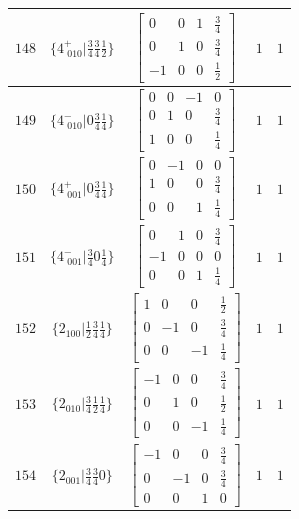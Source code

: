 \documentclass[fleqn,8pt]{jsarticle}
\begin{document}
\begin{longtable}{ccccc}
$ 148 $ & $ \{4^{+}_{\,\,010}|\frac{3}{4} \frac{3}{4} \frac{1}{2}\} $ & $ \begin{bmatrix} 0 & 0 & 1 & \frac{3}{4} \\ 0 & 1 & 0 & \frac{3}{4} \\ -1 & 0 & 0 & \frac{1}{2} \end{bmatrix} $ & $ 1 $ & $ 1 $ \\ \hline
$ 149 $ & $ \{4^{-}_{\,\,010}|0 \frac{3}{4} \frac{1}{4}\} $ & $ \begin{bmatrix} 0 & 0 & -1 & 0 \\ 0 & 1 & 0 & \frac{3}{4} \\ 1 & 0 & 0 & \frac{1}{4} \end{bmatrix} $ & $ 1 $ & $ 1 $ \\ \hline
$ 150 $ & $ \{4^{+}_{\,\,001}|0 \frac{3}{4} \frac{1}{4}\} $ & $ \begin{bmatrix} 0 & -1 & 0 & 0 \\ 1 & 0 & 0 & \frac{3}{4} \\ 0 & 0 & 1 & \frac{1}{4} \end{bmatrix} $ & $ 1 $ & $ 1 $ \\ \hline
$ 151 $ & $ \{4^{-}_{\,\,001}|\frac{3}{4} 0 \frac{1}{4}\} $ & $ \begin{bmatrix} 0 & 1 & 0 & \frac{3}{4} \\ -1 & 0 & 0 & 0 \\ 0 & 0 & 1 & \frac{1}{4} \end{bmatrix} $ & $ 1 $ & $ 1 $ \\ \hline
$ 152 $ & $ \{2{}_{100}|\frac{1}{2} \frac{3}{4} \frac{1}{4}\} $ & $ \begin{bmatrix} 1 & 0 & 0 & \frac{1}{2} \\ 0 & -1 & 0 & \frac{3}{4} \\ 0 & 0 & -1 & \frac{1}{4} \end{bmatrix} $ & $ 1 $ & $ 1 $ \\ \hline
$ 153 $ & $ \{2{}_{010}|\frac{3}{4} \frac{1}{2} \frac{1}{4}\} $ & $ \begin{bmatrix} -1 & 0 & 0 & \frac{3}{4} \\ 0 & 1 & 0 & \frac{1}{2} \\ 0 & 0 & -1 & \frac{1}{4} \end{bmatrix} $ & $ 1 $ & $ 1 $ \\ \hline
$ 154 $ & $ \{2{}_{001}|\frac{3}{4} \frac{3}{4} 0\} $ & $ \begin{bmatrix} -1 & 0 & 0 & \frac{3}{4} \\ 0 & -1 & 0 & \frac{3}{4} \\ 0 & 0 & 1 & 0 \end{bmatrix} $ & $ 1 $ & $ 1 $ \\ \hline

\end{longtable}
\end{document}
